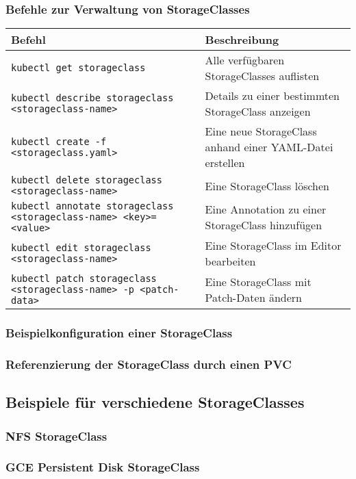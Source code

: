 \subsubsection{Befehle zur Verwaltung von StorageClasses}
\begin{tabular}{|p{}|p{}|}
\hline
\textbf{Befehl} & \textbf{Beschreibung} \\
\hline
\texttt{kubectl get storageclass} & Alle verfügbaren StorageClasses auflisten \\
\texttt{kubectl describe storageclass <storageclass-name>} & Details zu einer bestimmten StorageClass anzeigen \\
\texttt{kubectl create -f <storageclass.yaml>} & Eine neue StorageClass anhand einer YAML-Datei erstellen \\
\texttt{kubectl delete storageclass <storageclass-name>} & Eine StorageClass löschen \\
\texttt{kubectl annotate storageclass <storageclass-name> <key>=<value>} & Eine Annotation zu einer StorageClass hinzufügen \\
\texttt{kubectl edit storageclass <storageclass-name>} & Eine StorageClass im Editor bearbeiten \\
\texttt{kubectl patch storageclass <storageclass-name> -p <patch-data>} & Eine StorageClass mit Patch-Daten ändern \\
\hline
\end{tabular}
\newpage
\subsubsection{Beispielkonfiguration einer StorageClass}


\subsubsection{Referenzierung der StorageClass durch einen PVC}

\newpage
\subsection{Beispiele für verschiedene StorageClasses}
\subsubsection{NFS StorageClass}


\subsubsection{GCE Persistent Disk StorageClass}


